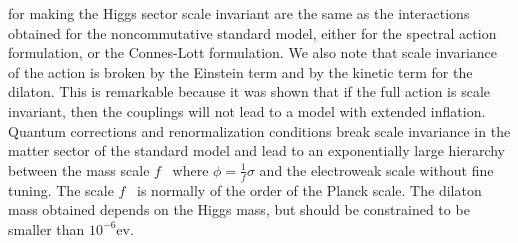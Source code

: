 \documentclass[12pt]{article}%
\begin{document}
for making the Higgs sector scale invariant are the same as the interactions
obtained for the noncommutative standard model, either for the spectral action
formulation, or the Connes-Lott formulation. We also note that scale
invariance of the action is broken by the Einstein term and by the kinetic
term for the dilaton. This is remarkable because it was shown that if the full
action is scale invariant, then the couplings will not lead to a model with
extended inflation. Quantum corrections and renormalization conditions break
scale invariance in the matter sector of the standard model and lead to an
exponentially large hierarchy between the mass scale $f$ \ where $\phi
=\frac{1}{f}\sigma$ and the electroweak scale without fine tuning. The scale
$f$ \ is normally of the order of the Planck scale. The dilaton mass obtained
depends on the Higgs mass, but should be constrained to be smaller than
$10^{-6}$ev. \ 
\end{document}
